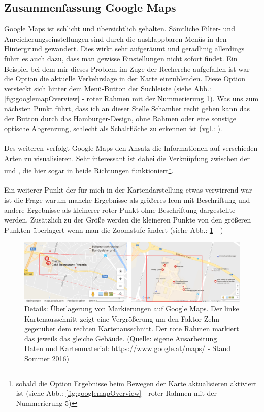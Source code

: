 \documentclass[../Bachelorarbeit.tex]{subfiles}
\begin{document}
\subsection{Zusammenfassung Google Maps}
Google Maps ist schlicht und übersichtlich gehalten.
Sämtliche Filter- und Anreicherungseinstellungen sind durch die ausklappbaren Menüs in den Hintergrund gewandert.
Dies wirkt sehr aufgeräumt und geradlinig allerdings führt es auch dazu, dass man gewisse Einstellungen nicht sofort findet.
Ein Beispiel bei dem mir dieses Problem im Zuge der Recherche aufgefallen ist war die Option die aktuelle Verkehrslage in der Karte einzublenden.
Diese Option versteckt sich hinter dem Menü-Button der Suchleiste (siehe Abb.: \ref{fig:googlemapOverview} - roter Rahmen mit der Nummerierung 1). 
Was uns zum nächsten Punkt führt, dass ich an dieser Stelle Schamber recht geben kann das der Button durch das Hamburger-Design, ohne Rahmen oder eine sonstige optische Abgrenzung, schlecht als Schaltfläche zu erkennen ist (vgl.: \cite{SchamberHamburgerIcon}).\\
\\
Des weiteren verfolgt Google Maps den Ansatz die Informationen auf verschieden Arten zu visualisieren. 
Sehr interessant ist dabei die Verknüpfung zwischen der  und , die hier sogar in beide Richtungen funktioniert\footnote{sobald die Option Ergebnisse beim Bewegen der Karte aktualisieren aktiviert ist (siehe Abb.: \ref{fig:googlemapOverview} - roter Rahmen mit der Nummerierung 5)}.\\
\\
Ein weiterer Punkt der für mich in der Kartendarstellung etwas verwirrend war ist die Frage warum manche Ergebnisse als größeres Icon mit Beschriftung und andere Ergebnisse als kleinerer roter Punkt ohne Beschriftung dargestellte werden. 
Zusätzlich zu der Größe werden die kleineren Punkte von den größeren Punkten überlagert wenn man die Zoomstufe ändert (siehe Abb.: \ref{fig:googlemapDetail} - )


\begin{figure}[H]
\centering
\includegraphics[width=1\linewidth]{img/StandDerTechnik/googlemapDetail}
\caption[Details: Überlagerung von Markierungen auf Google Maps]{Details: Überlagerung von Markierungen auf Google Maps. Der linke Kartenausschnitt zeigt eine Vergrößerung um den Faktor Zehn gegenüber dem rechten Kartenausschnitt. Der rote Rahmen markiert das jeweils das gleiche Gebäude. (Quelle: eigene Ausarbeitung | Daten und Kartenmaterial: https://www.google.at/maps/ - Stand Sommer 2016)}
\label{fig:googlemapDetail}
\end{figure}
\end{document}
